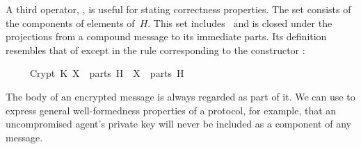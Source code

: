 \begin{isabellebody}
\begin{isamarkuptext}
A third operator, , is useful for stating correctness
properties.  The set
 consists of the components of elements of~$H$.  This set
includes~ and is closed under the projections from a compound
message to its immediate parts. 
Its definition resembles that of  except in the rule
corresponding to the constructor : 
\begin{isabelle}%
\ \ \ \ \ Crypt\ K\ X\ {}\ parts\ H\ {}\ X\ {}\ parts\ H%
\end{isabelle}
The body of an encrypted message is always regarded as part of it.  We can
use  to express general well-formedness properties of a protocol,
for example, that an uncompromised agent's private key will never be
included as a component of any message.%
\end{isamarkuptext}%
\isamarkuptrue%
%
\isadelimproof
%
\endisadelimproof
%
\isatagproof
%
\endisatagproof
{\isafoldproof}%
%
\isadelimproof
%
\endisadelimproof
%
\isadelimproof
%
\endisadelimproof
%
\isatagproof
%
\endisatagproof
{\isafoldproof}%
%
\isadelimproof
%
\endisadelimproof
%
\isadelimproof
%
\endisadelimproof
%
\isatagproof
%
\endisatagproof
{\isafoldproof}%
%
\isadelimproof
%
\endisadelimproof
%
\isadelimproof
%
\endisadelimproof
%
\isatagproof
%
\endisatagproof
{\isafoldproof}%
%
\isadelimproof
%
\endisadelimproof
%
\isadelimproof
%
\endisadelimproof
%
\isatagproof
%
\endisatagproof
{\isafoldproof}%
%
\isadelimproof
%
\endisadelimproof
%
\isadelimproof
%
\endisadelimproof
%
\isatagproof
%
\endisatagproof
{\isafoldproof}%
%
\isadelimproof
%
\endisadelimproof
%
\isadelimproof
%
\endisadelimproof
%
\isatagproof
%
\endisatagproof
{\isafoldproof}%
%
\isadelimproof
%
\endisadelimproof
%
\isadelimproof
%
\endisadelimproof
%
\isatagproof
%
\endisatagproof
{\isafoldproof}%
%
\isadelimproof
%
\endisadelimproof
%
\isadelimproof
%
\endisadelimproof
%
\isatagproof
%
\endisatagproof
{\isafoldproof}%
%
\isadelimproof
%
\endisadelimproof
%
\isadelimproof
%
\endisadelimproof
%
\isatagproof
%
\endisatagproof
{\isafoldproof}%
%
\isadelimproof
%
\endisadelimproof
%
\isadelimproof
%
\endisadelimproof
%
\isatagproof
%
\endisatagproof
{\isafoldproof}%
%
\isadelimproof
%
\endisadelimproof
%
\isadelimproof
%
\endisadelimproof
%
\isatagproof
%
\endisatagproof
{\isafoldproof}%
%
\isadelimproof
%
\endisadelimproof
%
\isadelimproof
%
\endisadelimproof
%
\isatagproof
%
\endisatagproof
{\isafoldproof}%
%
\isadelimproof

\end{isabellebody}
